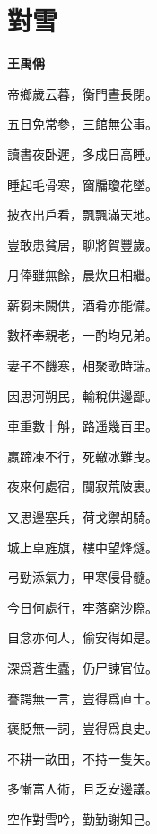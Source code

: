 \documentclass[12pt,a4paper]{ctexbook}
\begin{document}
\section{對雪}
\textbf{王禹偁}\par\vspace{0.5em}
帝鄉歲云暮，衡門晝長閉。\par
五日免常參，三館無公事。\par
讀書夜卧遲，多成日高睡。\par
睡起毛骨寒，窗牖瓊花墜。\par
披衣出戶看，飄飄滿天地。\par
豈敢患貧居，聊將賀豐歲。\par
月俸雖無餘，晨炊且相繼。\par
薪芻未闕供，酒肴亦能備。\par
數杯奉親老，一酌均兄弟。\par
妻子不饑寒，相聚歌時瑞。\par
因思河朔民，輸稅供邊鄙。\par
車重數十斛，路遥幾百里。\par
羸蹄凍不行，死轍冰難曳。\par
夜來何處宿，闃寂荒陂裏。\par
又思邊塞兵，荷戈禦胡騎。\par
城上卓旌旗，樓中望烽燧。\par
弓勁添氣力，甲寒侵骨髓。\par
今日何處行，牢落窮沙際。\par
自念亦何人，偷安得如是。\par
深爲蒼生蠹，仍尸諫官位。\par
謇諤無一言，豈得爲直士。\par
褒貶無一詞，豈得爲良史。\par
不耕一畝田，不持一隻矢。\par
多慚富人術，且乏安邊議。\par
空作對雪吟，勤勤謝知己。\par
\end{document}
